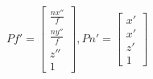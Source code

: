 $$
Pf' =
\begin{bmatrix}
  \frac{nx''}{f} \\
  \frac{ny''}{f} \\
  z'' \\
  1
\end{bmatrix}
,
Pn' =
\begin{bmatrix}
  x' \\
  x' \\
  z' \\
  1
\end{bmatrix}
$$